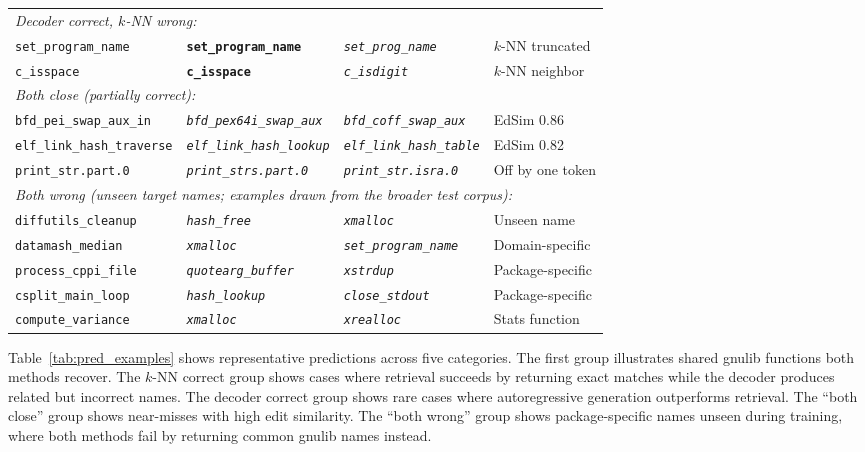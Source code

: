 \documentclass[sigconf,nonacm]{acmart}
\begin{document}
\begin{table}[t]
{\begin{tabular}{llll}
        \midrule
        \multicolumn{4}{l}{\textit{Decoder correct, $k$-NN wrong:}} \\
        \texttt{set\_program\_name} & \textbf{\texttt{set\_program\_name}} & \textit{\texttt{set\_prog\_name}} & $k$-NN truncated \\
        \texttt{c\_isspace} & \textbf{\texttt{c\_isspace}} & \textit{\texttt{c\_isdigit}} & $k$-NN neighbor \\
        \midrule
        \multicolumn{4}{l}{\textit{Both close (partially correct):}} \\
        \texttt{bfd\_pei\_swap\_aux\_in} & \textit{\texttt{bfd\_pex64i\_swap\_aux}} & \textit{\texttt{bfd\_coff\_swap\_aux}} & EdSim 0.86 \\
        \texttt{elf\_link\_hash\_traverse} & \textit{\texttt{elf\_link\_hash\_lookup}} & \textit{\texttt{elf\_link\_hash\_table}} & EdSim 0.82 \\
        \texttt{print\_str.part.0} & \textit{\texttt{print\_strs.part.0}} & \textit{\texttt{print\_str.isra.0}} & Off by one token \\
        \midrule
        \multicolumn{4}{l}{\textit{Both wrong (unseen target names; examples drawn from the broader test corpus):}} \\
        \texttt{diffutils\_cleanup} & \textit{\texttt{hash\_free}} & \textit{\texttt{xmalloc}} & Unseen name \\
        \texttt{datamash\_median} & \textit{\texttt{xmalloc}} & \textit{\texttt{set\_program\_name}} & Domain-specific \\
        \texttt{process\_cppi\_file} & \textit{\texttt{quotearg\_buffer}} & \textit{\texttt{xstrdup}} & Package-specific \\
        \texttt{csplit\_main\_loop} & \textit{\texttt{hash\_lookup}} & \textit{\texttt{close\_stdout}} & Package-specific \\
        \texttt{compute\_variance} & \textit{\texttt{xmalloc}} & \textit{\texttt{xrealloc}} & Stats function \\
        \bottomrule
    \end{tabular}%
    }
\end{table}

Table~\ref{tab:pred_examples} shows representative predictions across five categories. The first group illustrates shared gnulib functions both methods recover. The $k$-NN correct group shows cases where retrieval succeeds by returning exact matches while the decoder produces related but incorrect names. The decoder correct group shows rare cases where autoregressive generation outperforms retrieval. The ``both close'' group shows near-misses with high edit similarity. The ``both wrong'' group shows package-specific names unseen during training, where both methods fail by returning common gnulib names instead.
\end{document}
